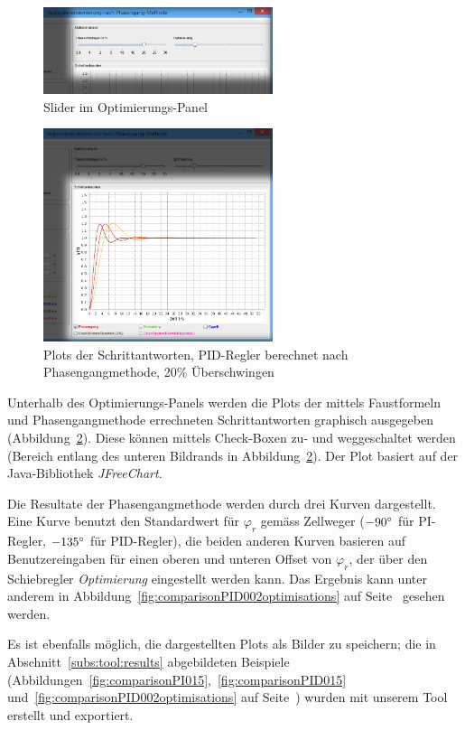 \begin{figure}[h!, width=\pagewidth]
    \centering
    \includegraphics[width=0.6\textwidth]{images/tool20UeberschwingenPIDOptimierungen.jpg}
    \caption{Slider im Optimierungs-Panel}
    \label{fig:optimierungen}
\end{figure}

\begin{figure}[h!, width=\pagewidth]
    \centering
    \includegraphics[width=0.6\textwidth]{images/tool20UeberschwingenPIDPlots.jpg}
    \caption{Plots der Schrittantworten, PID-Regler berechnet nach Phasengangmethode, 20\% \"Uberschwingen}
    \label{fig:tool20Plots}
\end{figure}

Unterhalb des  Optimierungs-Panels werden  die Plots der  mittels Faustformeln
und  Phasengangmethode   errechneten  Schrittantworten   graphisch  ausgegeben
(Abbildung~\ref{fig:tool20Plots}). Diese  k\"onnen   mittels  Check-Boxen  zu-
und   weggeschaltet  werden   (Bereich  entlang   des  unteren   Bildrands  in
Abbildung~\ref{fig:tool20Plots}). Der  Plot  basiert auf  der  Java-Bibliothek
\emph{JFreeChart}.

Die Resultate der Phasengangmethode werden durch drei Kurven dargestellt. Eine
Kurve   benutzt  den   Standardwert  f\"ur   $\varphi_r$  gem\"ass   Zellweger
($-90\degree$  f\"ur PI-Regler,  $-135\degree$ f\"ur  PID-Regler), die  beiden
anderen Kurven  basieren auf Benutzereingaben  f\"ur einen oberen  und unteren
Offset  von  $\varphi_r$,  der   \"uber  den  Schiebregler  \emph{Optimierung}
eingestellt       werden       kann. Das       Ergebnis       kann       unter
anderem      in     Abbildung~\ref{fig:comparisonPID002optimisations}      auf
Seite~\pageref{fig:comparisonPI015} gesehen werden.

Es   ist   ebenfalls   m\"oglich,   die   dargestellten   Plots   als   Bilder
zu   speichern;   die    in   Abschnitt~\ref{subs:tool:results}   abgebildeten
Beispiele   (Abbildungen~\ref{fig:comparisonPI015},~\ref{fig:comparisonPID015}
und~\ref{fig:comparisonPID002optimisations} auf Seite~\pageref{fig:comparisonPI015})
wurden mit unserem Tool erstellt und exportiert.

\clearpage
